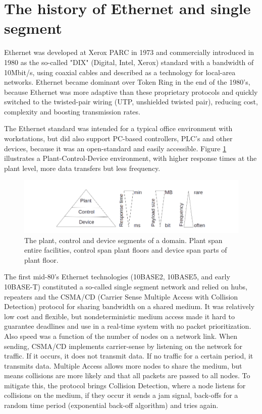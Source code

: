 \section{The history of Ethernet and single segment}

Ethernet was developed at Xerox PARC in 1973 and commercially introduced in 1980 as the so-called "DIX" (Digital, Intel, Xerox) standard with a bandwidth of 10Mbit/s, using coaxial cables and described as a technology for local-area networks. Ethernet became dominant over Token Ring in the end of the 1980's, because Ethernet was more adaptive than these proprietary protocols and quickly switched to the twisted-pair wiring (UTP, unshielded twisted pair), reducing cost, complexity and boosting transmission rates.

\noindent The Ethernet standard was intended for a typical office environment with workstations, but did also support PC-based controllers, PLC's and other devices, because it was an open-standard and easily accessible. Figure \ref{fig:plantcontroldevice} illustrates a Plant-Control-Device environment, with higher response times at the plant level, more data transfers but less frequency.

\begin{figure}[h!]\label{}
	\centering
	\includegraphics[scale=0.5]{realTimeEthernet/PlantControlDevice.png}
	\caption{The plant, control and device segments of a domain. Plant span entire facilities, control span plant floors and device span parts of plant floor.}
	\label{fig:plantcontroldevice}
\end{figure}

\noindent The first mid-80's Ethernet technologies (10BASE2, 10BASE5, and early 10BASE-T) constituted a so-called single segment network and relied on hubs, repeaters and the CSMA/CD (Carrier Sense Multiple Access with Collision Detection) protocol for sharing bandwidth on a shared medium. It was relatively low cost and flexible, but nondeterministic medium access made it hard to guarantee deadlines and use in a real-time system with no packet prioritization. Also speed was a function of the number of nodes on a network link. When sending, CSMA/CD implements carrier-sense by listening on the network for traffic. If it occurs, it does not transmit data. If no traffic for a certain period, it transmits data. Multiple Access allows more nodes to share the medium, but means collisions are more likely and that all packets are passed to all nodes. To mitigate this, the protocol brings Collision Detection, where a node listens for collisions on the medium, if they occur it sends a jam signal, back-offs for a random time period (exponential back-off algorithm) and tries again.

